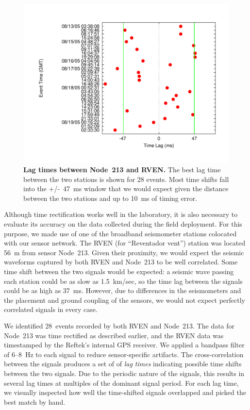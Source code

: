 \begin{figure}[t]
\label{evaluation-fig-rvenv213all}
\begin{center}
\includegraphics[width=\hsize]{./5-evaluation/figs/timing/RV213/Table/213-GOODDIFFS2.pdf}
\end{center}
\caption{\textbf{Lag times between Node~213 and RVEN.}
The best lag time between the two stations is shown for 28 events. Most time
shifts fall into the +/-~47~ms window that we would expect given the distance
between the two stations and up to 10~ms of timing error.}
\end{figure}


Although time rectification works well in the laboratory, it is also
necessary to evaluate its accuracy on the data collected during the field
deployment. For this purpose, we made use of one of the broadband seismometer
stations colocated with our sensor network. The RVEN (for ``Reventador
vent'') station was located 56~m from sensor Node~213. Given their
proximity, we would expect the seismic waveforms captured by both RVEN and
Node~213 to be well correlated. Some time shift between the two signals
would be expected: a seismic wave passing each station could be as slow as
1.5~km/sec, so the time lag between the signals could be as high as 37~ms.
However, due to differences in the seismometers and the placement and ground
coupling of the sensors, we would not expect perfectly correlated signals in
every case.

We identified 28~events recorded by both RVEN and Node~213. The data for
Node~213 was time rectified as described earlier, and the RVEN data was
timestamped by the Reftek's internal GPS receiver. We applied a bandpass
filter of 6--8~Hz to each signal to reduce sensor-specific artifacts. The
cross-correlation between the signals produces a set of of \textit{lag times}
indicating possible time shifts between the two signals. Due to the periodic
nature of the signals, this results in several lag times at multiples of the
dominant signal period. For each lag time, we visually inspected how well the
time-shifted signals overlapped and picked the best match by hand.

